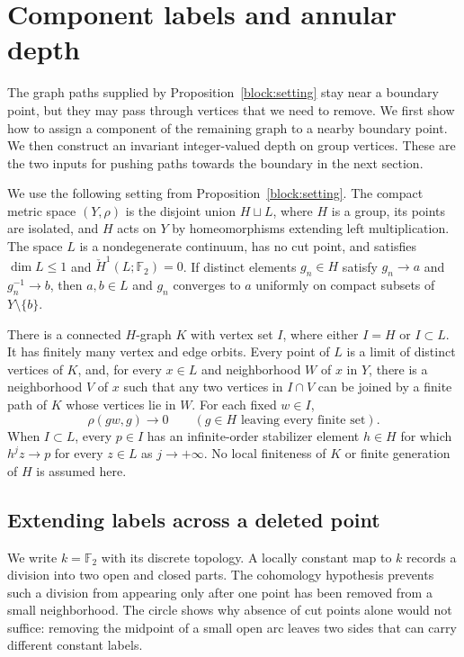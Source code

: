 \section{Component labels and annular depth}
\label{sec:annuli}

The graph paths supplied by Proposition~\ref{block:setting} stay near a
boundary point, but they may pass through vertices that we need to remove.
We first show how to assign a component of the remaining graph to a nearby
boundary point. We then construct an invariant integer-valued depth on
group vertices. These are the two inputs for pushing paths towards the
boundary in the next section.

We use the following setting from Proposition~\ref{block:setting}.
The compact metric space $(Y,\rho)$ is the disjoint union $H\sqcup L$,
where $H$ is a group, its points are isolated, and $H$ acts on $Y$ by
homeomorphisms extending left multiplication. The space $L$ is a
nondegenerate continuum, has no cut point, and satisfies
$\dim L\leq 1$ and $\check H^1(L;\mathbb F_2)=0$.
If distinct elements $g_n\in H$ satisfy $g_n\to a$ and
$g_n^{-1}\to b$, then $a,b\in L$ and $g_n$ converges to $a$ uniformly
on compact subsets of $Y\setminus\{b\}$.

There is a connected $H$-graph $K$ with vertex set $I$, where either
$I=H$ or $I\subset L$. It has finitely many vertex and edge orbits.
Every point of $L$ is a limit of distinct vertices of $K$, and, for every
$x\in L$ and neighborhood $W$ of $x$ in $Y$, there is a neighborhood
$V$ of $x$ such that any two vertices in $I\cap V$ can be joined by a
finite path of $K$ whose vertices lie in $W$.
For each fixed $w\in I$,
\[
  \rho(gw,g)\longrightarrow 0
  \qquad(g\in H\text{ leaving every finite set}).
\]
When $I\subset L$, every $p\in I$ has an infinite-order stabilizer
element $h\in H$ for which $h^jz\to p$ for every $z\in L$ as
$j\to+\infty$. No local finiteness of $K$ or finite generation of $H$
is assumed here.

\subsection{Extending labels across a deleted point}

We write $k=\mathbb F_2$ with its discrete topology. A locally constant
map to $k$ records a division into two open and closed parts.
The cohomology hypothesis prevents such a division from appearing only
after one point has been removed from a small neighborhood.
The circle shows why absence of cut points alone would not suffice:
removing the midpoint of a small open arc leaves two sides that can
carry different constant labels.

